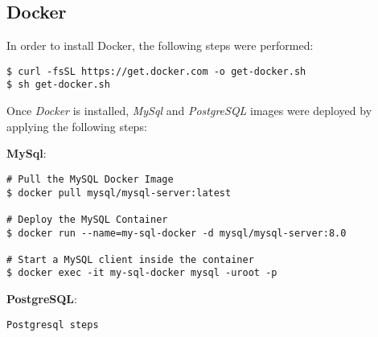 \subsection{\label{sec:despliegue-docker}Docker}

In order to install Docker, the following steps were performed:

\begin{verbatim}
$ curl -fsSL https://get.docker.com -o get-docker.sh
$ sh get-docker.sh
\end{verbatim}

Once \emph{Docker} is installed, \emph{MySql} and \emph{PostgreSQL} images were deployed by applying the following steps:

\textbf{MySql}:

\begin{verbatim}
# Pull the MySQL Docker Image
$ docker pull mysql/mysql-server:latest

# Deploy the MySQL Container
$ docker run --name=my-sql-docker -d mysql/mysql-server:8.0

# Start a MySQL client inside the container
$ docker exec -it my-sql-docker mysql -uroot -p
\end{verbatim}

\textbf{PostgreSQL}:

\begin{verbatim}
Postgresql steps
\end{verbatim}
